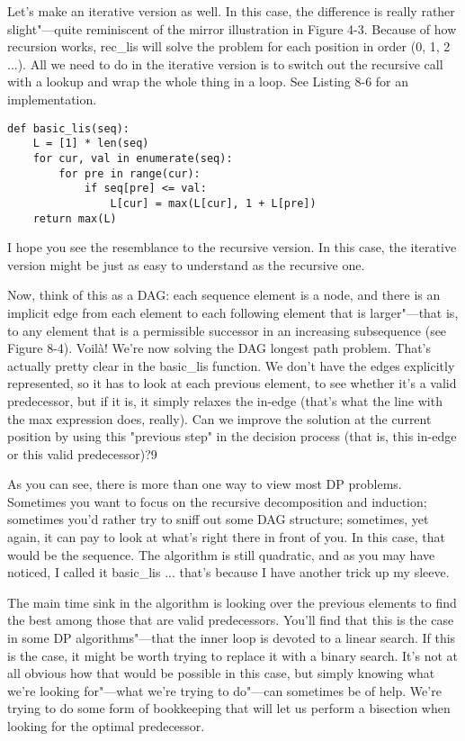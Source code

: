 Let's make an iterative version as well. In this case, the difference is really rather slight"---quite reminiscent of the mirror illustration in Figure 4-3. Because of how recursion works, rec\_lis will solve the problem for each position in order (0, 1, 2 ...). All we need to do in the iterative version is to switch out the recursive call with a lookup and wrap the whole thing in a loop. See Listing 8-6 for an implementation.
\begin{lstlisting}[caption={A Basic Iterative Solution to the Longest Increasing Subsequence Problem}]
def basic_lis(seq):
    L = [1] * len(seq)
    for cur, val in enumerate(seq):
        for pre in range(cur):
            if seq[pre] <= val:
                L[cur] = max(L[cur], 1 + L[pre])
    return max(L)
\end{lstlisting}

I hope you see the resemblance to the recursive version. In this case, the iterative version might be just as easy to understand as the recursive one.

Now, think of this as a DAG: each sequence element is a node, and there is an implicit edge from
each element to each following element that is larger"---that is, to any element that is a permissible successor in an increasing subsequence (see Figure 8-4). Voilà! We're now solving the DAG longest path problem. That's actually pretty clear in the basic\_lis function. We don't have the edges explicitly represented, so it has to look at each previous element, to see whether it's a valid predecessor, but if it is, it simply relaxes the in-edge (that's what the line with the max expression does, really). Can we improve the solution at the current position by using this "previous step" in the decision process (that is, this in-edge or this valid predecessor)?9

As you can see, there is more than one way to view most DP problems. Sometimes you want to focus
on the recursive decomposition and induction; sometimes you'd rather try to sniff out some DAG
structure; sometimes, yet again, it can pay to look at what's right there in front of you. In this case, that would be the sequence. The algorithm is still quadratic, and as you may have noticed, I called it basic\_lis ... that's because I have another trick up my sleeve.

The main time sink in the algorithm is looking over the previous elements to find the best among
those that are valid predecessors. You'll find that this is the case in some DP algorithms"---that the inner loop is devoted to a linear search. If this is the case, it might be worth trying to replace it with a binary search. It's not at all obvious how that would be possible in this case, but simply knowing what we're looking for"---what we're trying to do"---can sometimes be of help. We're trying to do some form of bookkeeping that will let us perform a bisection when looking for the optimal predecessor.


